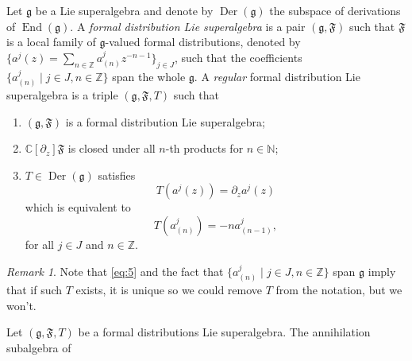 \documentclass[a4paper, 12pt, reqno]{amsart}
\theoremstyle{remark}
\newtheorem{remark}[theorem]{Remark}
\numberwithin{equation}{subsection}
\DeclareMathOperator{\End}{End}
\DeclareMathOperator{\Der}{Der}
\begin{document}
Let $\mathfrak{g}$ be a Lie superalgebra and denote by $\Der(\mathfrak{g})$ the subspace of derivations of $\End(\mathfrak{g})$.
A \emph{formal distribution Lie superalgebra} is a pair $(\mathfrak{g}, \mathfrak{F})$ such that $\mathfrak{F}$ is a local family of $\mathfrak{g}$-valued formal distributions, denoted by $\{a^j(z) = \sum_{n \in \mathbb{Z}}a^j_{(n)}z^{-n - 1}\}_{j \in J}$, such that the coefficients $\{a^j_{(n)} \mid j \in J, n \in \mathbb{Z}\}$ span the whole $\mathfrak{g}$.
A \emph{regular} formal distribution Lie superalgebra is a triple $(\mathfrak{g}, \mathfrak{F}, T)$ such that
\begin{enumerate}[label = (\alph*)]
\item $(\mathfrak{g}, \mathfrak{F})$ is a formal distribution Lie superalgebra;
\item $\mathbb{C}[\partial_z]\mathfrak{F}$ is closed under all $n$-th products for $n \in \mathbb{N}$;
\item $T \in \Der(\mathfrak{g})$ satisfies
  \begin{equation*}
    T(a^j(z)) = \partial_za^j(z)
  \end{equation*}
  which is equivalent to
  \begin{equation}
    \label{eq:5}
    T(a^j_{(n)}) = -na^j_{(n - 1)},
  \end{equation}
  for all $j \in J$ and $n \in \mathbb{Z}$. 
\end{enumerate}
\begin{remark}
  \label{rmk:3}
  Note that \eqref{eq:5} and the fact that $\{a^j_{(n)} \mid j \in J, n \in \mathbb{Z}\}$ span $\mathfrak{g}$ imply that if such $T$ exists, it is unique so we could remove $T$ from the notation, but we won't.
\end{remark}

Let $(\mathfrak{g}, \mathfrak{F}, T)$ be a formal distributions Lie superalgebra.
The annihilation subalgebra of 
\printindex



\end{document}
